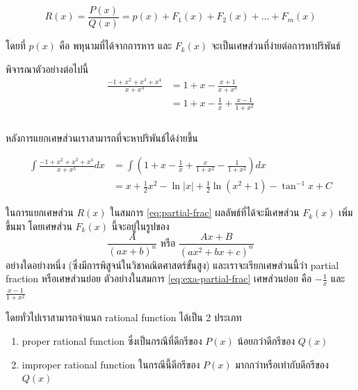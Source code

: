 \documentclass[
]{book}
\theoremstyle{definition}
\theoremstyle{definition}
\theoremstyle{definition}
\theoremstyle{definition}
\theoremstyle{remark}
\begin{document}
\begin{equation}
    R(x) = \frac{P(x)}{Q(x)} = p(x) + F_1(x) + F_2(x) + \ldots + F_m(x)
    \label{eq:partial-frac}
\end{equation}

โดยที่ \(p(x)\) คือ พหุนามที่ได้จากการหาร และ \(F_k(x)\)
จะเป็นเศษส่วนที่ง่ายต่อการหาปริพันธ์

พิจารณาตัวอย่างต่อไปนี้ \begin{equation}
     \begin{split}
        \frac{-1+x^2+x^3+x^4}{x + x^3} &= 1 +x - \frac{x+1}{x + x^3}  \\
                                       &= 1 +x -\frac{1}{x} + \frac{x-1}{1+x^2} \\
     \end{split}
     \label{eq:exa-partial-frac}
\end{equation}\\
หลังการแยกเศษส่วนเราสามารถที่จะหาปริพันธ์ได้ง่ายขึ้น

\begin{equation}
\begin{aligned}
        \int \frac{-1+x^2+x^3+x^4}{x + x^3}dx &= \int\left(1 +x -\frac{1}{x} + \frac{x}{1+x^2} -\frac{1}{1+x^2}\right)dx \\   
            &=x + \frac{1}{2}x^2 - \ln|x| +\frac{1}{2}\ln(x^2+1) -\tan^{-1}x + C
\end{aligned}
\end{equation}

ในการแยกเศษส่วน \(R(x)\) ในสมการ \eqref{eq:partial-frac} ผลลัพธ์ที่ได้จะมีเศษส่วน
\(F_k(x)\) เพิ่มขึ้นมา โดยเศษส่วน \(F_k(x)\) นี้จะอยู่ในรูปของ \begin{equation}
     \frac{A}{(ax + b)^n} \text{ หรือ } \frac{Ax + B}{(ax^2 + bx +c)^n}
     \label{eq:partial-frac-1}
\end{equation} อย่างใดอย่างหนึ่ง (ซึ่งมีการพิสูจน์ในวิชาคณิตศาสตร์ขั้นสูง)
และเราจะเรียกเศษส่วนนี้ว่า partial fraction หรือเศษส่วนย่อย ตัวอย่างในสมการ
\eqref{eq:exa-partial-frac} เศษส่วนย่อย คือ \(-\frac{1}{x}\) และ
\(\frac{x-1}{1+x^2}\)

โดยทั่วไปเราสามารถจำแนก rational function ได้เป็น 2 ประเภท

\begin{enumerate}
\def\labelenumi{\arabic{enumi}.}
\item
  proper rational function ซึ่งเป็นกรณีที่ดีกรีของ \(P(x)\) น้อยกว่าดีกรีของ \(Q(x)\)
\item
  improper rational function ในกรณีนี้ดีกรีของ \(P(x)\) มากกว่าหรือเท่ากับดีกรีของ
  \(Q(x)\)
\end{enumerate}
\end{document}
